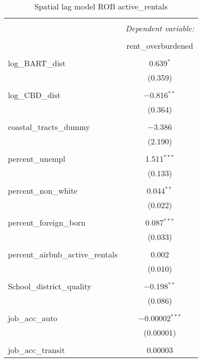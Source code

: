 \documentclass[10pt, letterpaper]{amsart}
\begin{document}
\begin{table}[H] \centering 
  \caption{Spatial lag model ROB active\_rentals} 
  \label{} 
  \begin{tabular}{@{\extracolsep{5pt}}lc} 
    \\[-1.8ex]\hline 
    \hline \\[-1.8ex] 
    & \multicolumn{1}{c}{\textit{Dependent variable:}} \\ 
    \cline{2-2} 
    \\[-1.8ex] & rent\_overburdened \\ 
    \hline \\[-1.8ex] 
    log\_BART\_dist & 0.639$^{*}$ \\ 
    & (0.359) \\ 
    & \\ 
    log\_CBD\_dist & $-$0.816$^{**}$ \\ 
    & (0.364) \\ 
    & \\ 
    coastal\_tracts\_dummy & $-$3.386 \\ 
    & (2.190) \\ 
    & \\ 
    percent\_unempl & 1.511$^{***}$ \\ 
    & (0.133) \\ 
    & \\ 
    percent\_non\_white & 0.044$^{**}$ \\ 
    & (0.022) \\ 
    & \\ 
    percent\_foreign\_born & 0.087$^{***}$ \\ 
    & (0.033) \\ 
    & \\ 
    percent\_airbnb\_active\_rentals & 0.002 \\ 
    & (0.010) \\ 
    & \\ 
    School\_district\_quality & $-$0.198$^{**}$ \\ 
    & (0.086) \\ 
    & \\ 
    job\_acc\_auto & $-$0.00002$^{***}$ \\ 
    & (0.00001) \\ 
    & \\ 
    job\_acc\_transit & 0.00003 \\ 

\end{tabular}
\end{table}
\end{document}
